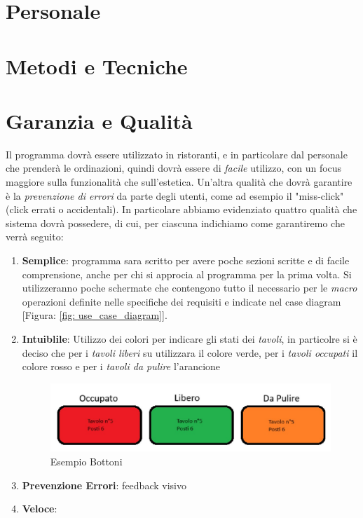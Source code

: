 \documentclass{book}
\begin{document}
\section{Personale}

\section{Metodi e Tecniche}

\section{Garanzia e Qualità}

Il programma dovrà essere utilizzato in ristoranti, e in particolare dal personale che prenderà le ordinazioni, quindi dovrà essere di \textit{facile} utilizzo, con un focus maggiore sulla funzionalità che sull'estetica. Un'altra qualità che dovrà garantire è la \textit{prevenzione di errori} da parte degli utenti, come ad esempio il "miss-click" (click errati o accidentali).
In particolare abbiamo evidenziato quattro qualità che sistema dovrà possedere, di cui, per ciascuna indichiamo come garantiremo che verrà seguito:

\begin{enumerate}
    \item \textbf{Semplice}: programma sara scritto per avere poche sezioni scritte e di facile comprensione, anche per chi si approcia al programma per la prima volta. Si utilizzeranno poche schermate che contengono tutto il necessario per le \textit{macro} operazioni definite nelle specifiche dei requisiti e indicate nel case diagram [Figura: \ref{fig: use_case_diagram}].
    \item \textbf{Intuiblile}: Utilizzo dei colori per indicare gli stati dei \textit{tavoli}, in particolre si è deciso che per i \textit{tavoli liberi} su utilizzara il colore verde, per i \textit{tavoli occupati} il colore rosso e per i \textit{tavoli da pulire} l'arancione
    \begin{figure}[h]
        \centering
        \includegraphics[width=0.6\linewidth]{../../Immagini/Esempio_Bottoni.jpg}
        \caption{Esempio Bottoni}
        \label{fig: es_bottoni}
    \end{figure}
    \item \textbf{Prevenzione Errori}: feedback visivo
    \item \textbf{Veloce}:
\end{enumerate}
\end{document}
